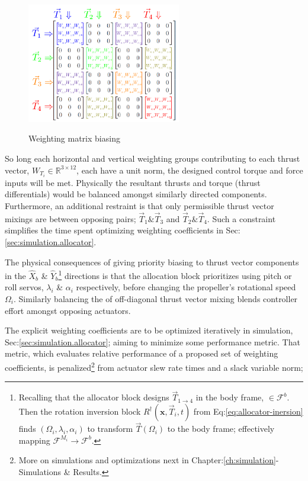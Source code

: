 \begin{figure}[htbp]
\centering
\includegraphics[width=0.6\textwidth]{figs/weighted-matrix}
\label{fig:weighted-matrix}
\caption{Weighting matrix biasing}
\end{figure}
\par
So long each horizontal and vertical weighting groups contributing to each thrust vector, $W_{T_i}\in\mathbb{R}^{3\times 12}$, each have a unit norm, the designed control torque and force inputs will be met. Physically the resultant thrusts and torque (thrust differentials) would be balanced amongst similarly directed components. Furthermore, an additional restraint is that only permissible thrust vector mixings are between opposing pairs; $\vec{T}_1\text{\&}\vec{T}_3$ and $\vec{T}_2\text{\&}\vec{T}_4$. Such a constraint simplifies the time spent optimizing weighting coefficients in Sec:\ref{sec:simulation.allocator}.
\par
The physical consequences of giving priority biasing to thrust vector components in the $\hat{X}_b$ \& $\hat{Y}_b$\footnote{Recalling that the allocator block designs $\vec{T}_{1\rightarrow 4}$ in the body frame, $\in\mathcal{F}^b$. Then the rotation inversion block $R^\dagger(\mathbf{x},\vec{T}_i,t)$ from Eq:\ref{eq:allocator-inersion} finds $(\Omega_i,\lambda_i,\alpha_i)$ to transform $\vec{T}(\Omega_i)$ to the body frame; effectively mapping $\mathcal{F}^{M_i}\rightarrow\mathcal{F}^b$.} directions is that the allocation block prioritizes using pitch or roll servos, $\lambda_i$ \& $\alpha_i$ respectively, before changing the propeller's rotational speed $\Omega_i$. Similarly balancing the of off-diagonal thrust vector mixing blends controller effort amongst opposing actuators. 
\par
The explicit weighting coefficients are to be optimized iteratively in simulation, Sec:\ref{sec:simulation.allocator}; aiming to minimize some performance metric. That metric, which evaluates relative performance of a proposed set of weighting coefficients, is penalized\footnote{More on simulations and optimizations next in Chapter:\ref{ch:simulation}-Simulations \& Results.} from actuator slew rate times and a slack variable norm;
